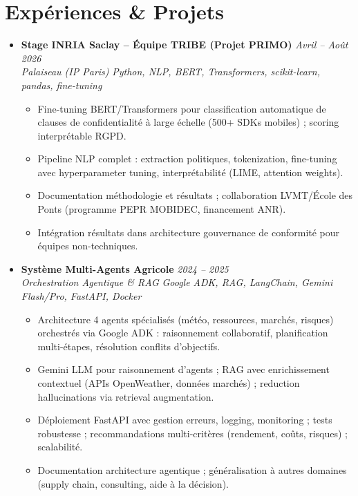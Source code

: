 \documentclass[a4paper,11pt]{article}
\begin{document}
\section{Exp\'eriences \& Projets}
\begin{itemize}[leftmargin=*, label={-}]
    \item \textbf{Stage INRIA Saclay -- \'Equipe TRIBE (Projet PRIMO)} \hfill \textit{Avril -- Ao\^ut 2026} \\
    \textit{Palaiseau (IP Paris)} \hfill \textit{Python, NLP, BERT, Transformers, scikit-learn, pandas, fine-tuning}
    \vspace{-2pt}
    \begin{itemize}[leftmargin=0.4cm, nosep, label=\tiny$\bullet$]
        \item \small{Fine-tuning BERT/Transformers pour classification automatique de clauses de confidentialité à large échelle (500+ SDKs mobiles) ; scoring interprétable RGPD.}
        \item \small{Pipeline NLP complet : extraction politiques, tokenization, fine-tuning avec hyperparameter tuning, interprétabilité (LIME, attention weights).}
        \item \small{Documentation méthodologie et résultats ; collaboration LVMT/École des Ponts (programme PEPR MOBIDEC, financement ANR).}
        \item \small{Intégration résultats dans architecture gouvernance de conformité pour équipes non-techniques.}
    \end{itemize}
    \vspace{3pt}

    \item \textbf{Syst\`eme Multi-Agents Agricole} \hfill \textit{2024 -- 2025} \\
    \textit{Orchestration Agentique \& RAG} \hfill \textit{Google ADK, RAG, LangChain, Gemini Flash/Pro, FastAPI, Docker}
    \vspace{-2pt}
    \begin{itemize}[leftmargin=0.4cm, nosep, label=\tiny$\bullet$]
        \item \small{Architecture 4 agents spécialisés (météo, ressources, marchés, risques) orchestrés via Google ADK : raisonnement collaboratif, planification multi-étapes, résolution conflits d'objectifs.}
        \item \small{Gemini LLM pour raisonnement d'agents ; RAG avec enrichissement contextuel (APIs OpenWeather, données marchés) ; reduction hallucinations via retrieval augmentation.}
        \item \small{Déploiement FastAPI avec gestion erreurs, logging, monitoring ; tests robustesse ; recommandations multi-critères (rendement, coûts, risques) ; scalabilité.}
        \item \small{Documentation architecture agentique ; généralisation à autres domaines (supply chain, consulting, aide à la décision).}
    \end{itemize}
    \vspace{3pt}


\end{itemize}
\end{document}
